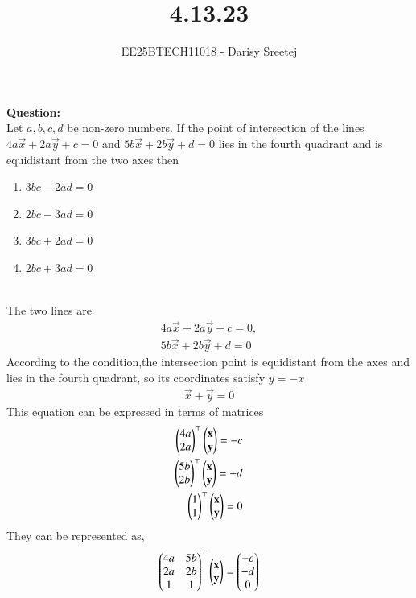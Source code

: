 \documentclass[journal,12pt,onecolumn]{IEEEtran}
\begin{document}
\title{4.13.23}
\author{EE25BTECH11018 - Darisy Sreetej}
{\let\newpage\relax\maketitle}
\textbf{Question:}\\
Let $a, b, c ,d$ be non-zero numbers. If the point of intersection of the lines $4a\vec{x} +2a\vec{y} + c = 0$ and $5b\vec{x} + 2b\vec{y} + d = 0$ lies in the fourth quadrant and is equidistant from the two axes then
\begin{enumerate}
    \item $3bc-2ad=0$
    \item $2bc-3ad=0$
    \item $3bc+2ad=0$
    \item $2bc+3ad=0$
\end{enumerate}
\solution\\
The two lines are
\begin{align}
4a\vec{x} +2a\vec{y} + c = 0  , \\
5b\vec{x} + 2b\vec{y} + d = 0 
\end{align}
According to the condition,the intersection point is equidistant from the axes and lies in the fourth quadrant, so its coordinates satisfy $y=-x$ \\
\begin{align}
\vec{x}+\vec{y}=0
\end{align}
This equation can be expressed in terms of matrices
\begin{align}
\begin{pmatrix}4a\\2a\end{pmatrix}^\top\begin{pmatrix}\mathbf{x}\\\mathbf{y}\end{pmatrix}=-c\\
\begin{pmatrix}5b\\2b\end{pmatrix}^\top\begin{pmatrix}\mathbf{x}\\\mathbf{y}\end{pmatrix}=-d\\
\begin{pmatrix}1\\1\end{pmatrix}^\top\begin{pmatrix}\mathbf{x}\\\mathbf{y}\end{pmatrix}=0
\end{align}
They can be represented as,
\begin{align}
    \begin{pmatrix}4a&5b\\2a&2b\\1&1\end{pmatrix}^\top\begin{pmatrix}\mathbf{x}\\\mathbf{y}\end{pmatrix}=\begin{pmatrix}-c\\-d\\0\end{pmatrix}
\end{align}
\end{document}
